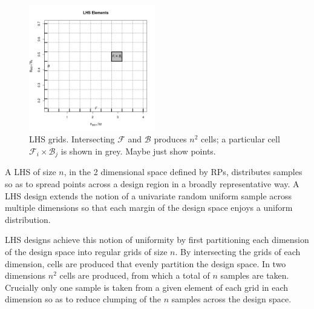 %
\begin{figure}
\includegraphics[width=0.49\textwidth]{../gpBias/designGrid.png}
\caption{ LHS grids. Intersecting $\mathcal{F}$ and $\mathcal{B}$ produces $n^2$
cells; a particular cell $\mathcal{F}_i\times\mathcal{B}_j$ is shown in grey. 
{\color{red} Maybe just show points.}
}
\end{figure}


%
A LHS of size $n$, in the 2 dimensional space defined 
by RPs, distributes samples so as to spread points across a design region in a 
broadly representative way. A LHS design extends the notion of a univariate 
random uniform sample across multiple dimensions so that each margin of the design 
space enjoys a uniform distribution. 

%
LHS designs achieve this notion of uniformity by first partitioning each dimension 
of the design space into regular grids of size $n$. By intersecting the grids 
of each dimension, cells are produced that evenly partition the design space. 
In two dimensions $n^2$ cells are produced, from which a total of $n$ samples 
are taken. Crucially only one sample is taken from a given element of each grid 
in each dimension so as to reduce clumping of the $n$ samples across the design space.



